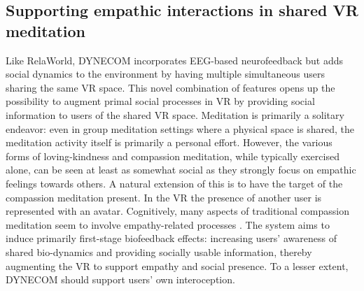 \documentclass[manuscript, review = false, screen]{acmart}
\begin{document}
\subsection{Supporting empathic interactions in shared VR meditation}
Like RelaWorld, DYNECOM incorporates EEG-based neurofeedback but adds social dynamics to the environment by having multiple simultaneous users sharing the same VR space. This novel combination of features opens up the possibility to augment primal social processes in VR by providing social information \cite{Van_Kleef_2010} to users of the shared VR space. Meditation is primarily a solitary endeavor: even in group meditation settings where a physical space is shared, the meditation activity itself is primarily a personal effort. However, the various forms of loving-kindness and compassion meditation, while typically exercised alone, can be seen at least as somewhat social as they strongly focus on empathic feelings towards others. A natural extension of this is to have the target of the compassion meditation present. In the VR the presence of another user is represented with an avatar. Cognitively, many aspects of traditional compassion meditation seem to involve empathy-related processes \cite{Hutcherson2008, Hofmann2011}. The system aims to induce primarily first-stage biofeedback effects: increasing users' awareness of shared bio-dynamics and providing socially usable information, thereby augmenting the VR to support empathy and social presence. To a lesser extent, DYNECOM should support users' own interoception.%
\end{document}
